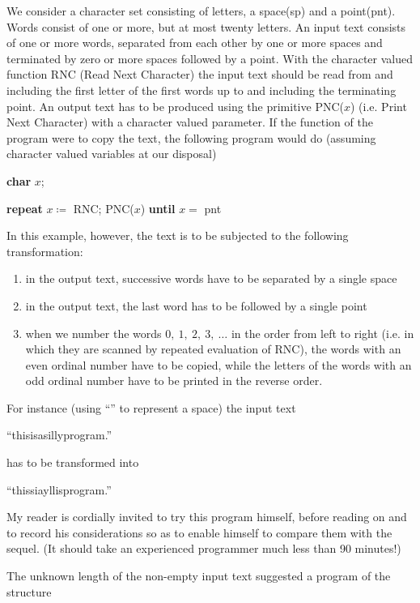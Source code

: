 \documentclass[twoside,11pt]{book}
\begin{document}
We consider a character set consisting of letters, a space(sp) and a point(pnt). Words consist of one or more, but at most twenty letters. An input text consists of one or more words, separated from each other by one or more spaces and terminated by zero or more spaces followed by a point. With the character valued function RNC (Read Next Character) the input text should be read from and including the first letter of the first words up to and including the terminating point. An output text has to be produced using the primitive PNC($x$) (i.e. Print Next Character) with a character valued parameter. If the function of the program were to copy the text, the following program would do (assuming character valued variables at our disposal)

\quad \textbf{char} $x$;

\quad \textbf{repeat} $x \coloneq$ RNC; PNC($x$) \textbf{until} $x =$ pnt

In this example, however, the text is to be subjected to the following transformation:

\begin{enumerate}[wide, nosep, label=(\arabic*)]
	\item in the output text, successive words have to be separated by a single space
	\item in the output text, the last word has to be followed by a single point
	\item when we number the words $0,\ 1,\ 2,\ 3,\ \dots$ in the order from left to right (i.e. in which they are scanned by repeated evaluation of RNC), the words with an even ordinal number have to be copied, while the letters of the words with an odd ordinal number have to be printed in the reverse order.
\end{enumerate}

For instance (using ``\textendash'' to represent a space) the input text

\quad ``this\textemdash{}is\textemdash{}a\textemdash{}silly\textemdash{}program\textemdash{}.''

\noindent
has to be transformed into

\quad ``this\textendash si\textendash a\textendash yllis\textendash program.''

My reader is cordially invited to try this program himself, before reading on and to record his considerations so as to enable himself to compare them with the sequel. (It should take an experienced programmer much less than 90 minutes!)

The unknown length of the non-empty input text suggested a program of the structure
\end{document}
